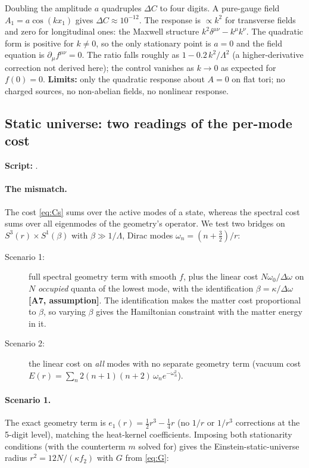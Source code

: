 \documentclass[11pt]{article}
\newcommand{\repo}{https://github.com/juhameskanen/abstract/blob/main/tests}
\newcommand{\testfile}[1]{\href{\repo/#1}{\texttt{\detokenize{#1}}}}
\newcommand{\flag}[1]{\textbf{[#1]}}
\begin{document}
Doubling the amplitude $a$ quadruples $\Delta C$ to four digits. A pure-gauge field $A_1=a\cos(kx_1)$ gives $\Delta C\approx10^{-12}$.
The response is $\propto k^2$ for transverse fields and zero for longitudinal ones: the Maxwell structure
$k^2\delta^{\mu\nu}-k^\mu k^\nu$. The quadratic form is positive for $k\neq0$, so the only stationary point is $a=0$ and the field equation is $\partial_\mu f^{\mu\nu}=0$.
The ratio falls roughly as $1-0.2\,k^2/\Lambda^2$ (a higher-derivative correction not derived here); the control vanishes as $k\to0$
as expected for $f(0)=0$.
\textbf{Limits:} only the quadratic response about $A=0$ on flat tori; no charged sources, no non-abelian fields, no nonlinear response.


\subsection{Static universe: two readings of the per-mode cost}
\label{sec:static}

\textbf{Script:} \testfile{two_scenarios_static_universe.py}.

\paragraph{The mismatch.} The cost \eqref{eq:Cs} sums over the active modes of a state, whereas the spectral cost sums over all
eigenmodes of the geometry's operator. We test two bridges on $S^3(r)\times S^1(\beta)$ with $\beta\gg1/\Lambda$,
Dirac modes $\omega_n=(n+\tfrac32)/r$:
\begin{description}
\item[Scenario 1:] full spectral geometry term with smooth $f$, plus the linear cost $N\omega_0/\Delta\omega$ on $N$ \emph{occupied} quanta
of the lowest mode, with the identification $\beta=\kappa/\Delta\omega$ \flag{A7, assumption}. The identification makes the matter
cost proportional to $\beta$, so varying $\beta$ gives the Hamiltonian constraint with the matter energy in it.
\item[Scenario 2:] the linear cost on \emph{all} modes with no separate geometry term (vacuum cost $E(r)=\sum_n 2(n+1)(n+2)\,\omega_ne^{-\omega_n^2}$).
\end{description}

\paragraph{Scenario 1.} The exact geometry term is $e_1(r)=\tfrac12r^3-\tfrac14r$ (no $1/r$ or $1/r^3$ corrections at the 5-digit level),
matching the heat-kernel coefficients. Imposing both stationarity conditions (with the counterterm $m$ solved for) gives
the Einstein-static-universe radius $r^2=12N/(\kappa f_2)$ with $G$ from \eqref{eq:G}:
\end{document}
